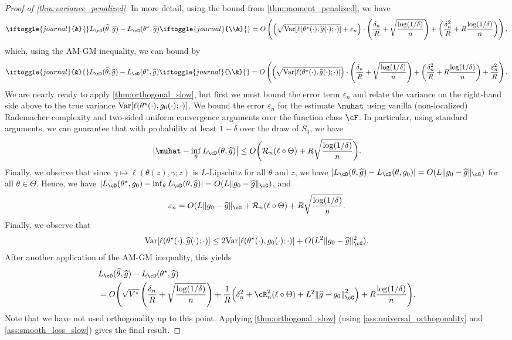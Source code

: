 \documentclass[11pt]{article} %
\newcommand{\journal}[1]{\iftoggle{journal}{#1}{}}
\newcommand{\pref}[1]{\cref{#1}}
\newcommand{\pfref}[1]{Proof of \pref{#1}}
\theoremstyle{theorem}  %
\theoremstyle{plain}
\DeclarePairedDelimiter{\abs}{\lvert}{\rvert} %
\DeclarePairedDelimiter{\brk}{[}{]}
\DeclarePairedDelimiter{\prn}{(}{)}
\DeclarePairedDelimiter{\nrm}{\|}{\|}
\newcommand{\ls}{\ell}
\newcommand{\veps}{\varepsilon}
\newcommand{\wh}[1]{\widehat{#1}}
\newcommand{\bigoh}{O}
\newcommand{\Radexp}{\mathcal{R}_n}
\newcommand{\poprisk}{L_{\cD}}
\newcommand{\var}{\mathrm{Var}}
\newcommand{\estone}{\wh{g}}
\newcommand{\esttwo}{\wh{\theta}}
\newcommand{\nuisance}{\cG}
\newcommand{\target}{\Theta}
\newcommand{\besttwo}{\theta^{\star}}
\newcommand{\gtone}{g_0}
\renewcommand{\hat}[1]{\wh{#1}}
\begin{document}
\begin{proof}[\pfref{thm:variance_penalized}]
In more detail, using the bound from \pref{thm:moment_penalized}, we have
\begin{align*}
\journal{&}\poprisk(\esttwo, \estone) - \poprisk(\besttwo, \estone) \journal{\\&}= O\left(\prn*{\sqrt{\var\brk*{\ell(\besttwo(\cdot), \estone(\cdot); \cdot)}}+\veps_n}\cdot\left(\frac{\delta_n}{R}+\sqrt{\frac{\log(1/\delta)}{n}}\right) + \left(\frac{\delta_n^2}{R}+R\frac{\log(1/\delta)}{n}\right)\right),
\end{align*}
which, using the AM-GM inequality, we can bound by
\begin{align*}
\journal{&}\poprisk(\esttwo, \estone) - \poprisk(\besttwo, \estone) \journal{\\&}= O\left(\prn*{\sqrt{\var\brk*{\ell(\besttwo(\cdot), \estone(\cdot); \cdot)}}}\cdot\left(\frac{\delta_n}{R}+\sqrt{\frac{\log(1/\delta)}{n}}\right) + \left(\frac{\delta_n^2}{R}+R\frac{\log(1/\delta)}{n}\right) + \frac{\veps_n^{2}}{R}\right).
\end{align*}
We are nearly ready to apply \pref{thm:orthogonal_slow}, but first we
must bound the error term $\veps_n$ and relate the variance on the
right-hand side above to the true variance $\var\brk*{\ell(\besttwo(\cdot),
      \gtone(\cdot);
      \cdot)}$. We bound the error $\veps_n$ for the estimate $\muhat$ using vanilla (non-localized) Rademacher complexity and two-sided uniform convergence arguments over the function class $\cF$. In particular, using standard arguments, we can guarantee that with probability at least $1-\delta$ over the draw of $S_3$, we have
\[
\abs[\big]{\muhat - \inf_\theta L_{\cD}(\theta, \estone)} \leq{} \bigoh\prn[\bigg]{\Radexp(\ls\circ\target) + R\sqrt{\frac{\log(1/\delta)}{n}}}.
\]
Finally, we observe that since
$\gamma\mapsto{}\ls(\theta(z),\gamma;z)$ is $L$-Lipschitz for all
$\theta$ and $z$, we have $|L_{\cD}(\theta, \estone)-L_{\cD}(\theta,
\gtone)| =  O(L\|\gtone-\estone\|_{\nuisance})$ for all $\theta\in
\target$. Hence, we have $|L_{\cD}(\besttwo, \gtone) - \inf_{\theta}
L_{\cD}(\theta, \hat{g})| =  O(L\|\gtone-\estone\|_{\nuisance})$, and
\[
\veps_n = \bigoh(L\nrm{\gtone-\estone}_{\nuisance} + \Radexp(\ls\circ\target) + R\sqrt{\frac{\log(1/\delta)}{n}}.
\]
Finally, we observe that
\[
  \var\brk*{\ell(\besttwo(\cdot),
      \estone(\cdot); \cdot)}\leq 2\var\brk*{\ell(\besttwo(\cdot),
      \gtone(\cdot);
      \cdot)} + \bigoh(L^2\|\gtone-\estone\|^2_{\nuisance}).
  \] After another application of the AM-GM inequality, this yields
  \begin{align}
  &L_{\cD}(\esttwo, \estone) - L_{\cD}(\besttwo, \estone) \notag\\&= O\prn*{ \sqrt{V^{\star}}\left(\frac{\delta_n}{R}  + \sqrt{\frac{\log(1/\delta)}{n}}\right) + \frac{1}{R}\prn*{\delta_n^{2} + \cR_n^{2}(\ls\circ\target) + L^2\nrm*{\estone-\gtone}_{\nuisance}^{2}} + R\frac{\log(1/\delta)}{n}
    }.
    \label{eq:variance_penalized_pseudo}
  \end{align}
  Note that we have not used orthogonality up to this point. Applying
  \pref{thm:orthogonal_slow} (using \pref{ass:universal_orthogonality}
  and \pref{ass:smooth_loss_slow}) gives the final result.
\end{proof}
\end{document}
